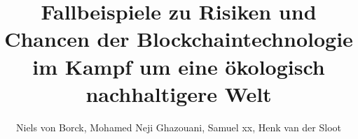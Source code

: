 
\usepackage{graphicx}





%

%


\title{Fallbeispiele zu Risiken und Chancen der Blockchaintechnologie im Kampf um eine ökologisch nachhaltigere Welt}
\author{Niels von Borck, Mohamed Neji Ghazouani, Samuel xx, Henk van der Sloot}

\makeindex[title=Index, options=-s indexstyle.ist, intoc]

\makenoidxglossaries
{}


\maketitle


\tableofcontents \newpage

 \clearpage
 \clearpage
 \clearpage

